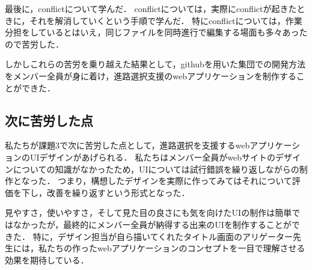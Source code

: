 \documentclass[a4j, titlepage]{jarticle}
\begin{document}
最後に，conflictについて学んだ．
conflictについては，実際にconflictが起きたときに，それを解消していくという手順で学んだ．
特にconflictについては，作業分担をしているとはいえ，同じファイルを同時進行で編集する場面も多々あったので苦労した．

しかしこれらの苦労を乗り越えた結果として，githubを用いた集団での開発方法をメンバー全員が身に着け，進路選択支援のwebアプリケーションを制作することができた．
\subsection{次に苦労した点}
私たちが課題3で次に苦労した点として，進路選択を支援するwebアプリケーションのUIデザインがあげられる．
私たちはメンバー全員がwebサイトのデザインについての知識がなかったため，UIについては試行錯誤を繰り返しながらの制作となった．
つまり，構想したデザインを実際に作ってみてはそれについて評価を下し，改善を繰り返すという形式となった．

見やすさ，使いやすさ，そして見た目の良さにも気を向けたUIの制作は簡単ではなかったが，最終的にメンバー全員が納得する出来のUIを制作することができた．
特に，デザイン担当が自ら描いてくれたタイトル画面のアリゲーター先生には，私たちの作ったwebアプリケーションのコンセプトを一目で理解させる効果を期待している．\\
\end{document}
